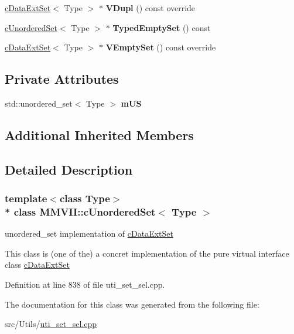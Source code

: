 \begin{DoxyCompactItemize}
\item 
\hyperlink{classMMVII_1_1cDataExtSet}{c\+Data\+Ext\+Set}$<$ Type $>$ $\ast$ {\bfseries V\+Dupl} () const override\hypertarget{classMMVII_1_1cUnorderedSet_af3d195fd0b2a911eee0072f65abbe82b}{}\label{classMMVII_1_1cUnorderedSet_af3d195fd0b2a911eee0072f65abbe82b}

\item 
\hyperlink{classMMVII_1_1cUnorderedSet}{c\+Unordered\+Set}$<$ Type $>$ $\ast$ {\bfseries Typed\+Empty\+Set} () const \hypertarget{classMMVII_1_1cUnorderedSet_aba542f65f1ab34612d477596a91e637b}{}\label{classMMVII_1_1cUnorderedSet_aba542f65f1ab34612d477596a91e637b}

\item 
\hyperlink{classMMVII_1_1cDataExtSet}{c\+Data\+Ext\+Set}$<$ Type $>$ $\ast$ {\bfseries V\+Empty\+Set} () const override\hypertarget{classMMVII_1_1cUnorderedSet_acc61ff15f305427632bd4e7a24b78baa}{}\label{classMMVII_1_1cUnorderedSet_acc61ff15f305427632bd4e7a24b78baa}

\end{DoxyCompactItemize}
\subsection*{Private Attributes}
\begin{DoxyCompactItemize}
\item 
std\+::unordered\+\_\+set$<$ Type $>$ {\bfseries m\+US}\hypertarget{classMMVII_1_1cUnorderedSet_acfb879540993e1777a9453fbca1e7734}{}\label{classMMVII_1_1cUnorderedSet_acfb879540993e1777a9453fbca1e7734}

\end{DoxyCompactItemize}
\subsection*{Additional Inherited Members}


\subsection{Detailed Description}
\subsubsection*{template$<$class Type$>$\\*
class M\+M\+V\+I\+I\+::c\+Unordered\+Set$<$ Type $>$}

unordered\+\_\+set implementation of \hyperlink{classMMVII_1_1cDataExtSet}{c\+Data\+Ext\+Set} 

This class is (one of the) a concret implementation of the pure virtual interface class \hyperlink{classMMVII_1_1cDataExtSet}{c\+Data\+Ext\+Set} 

Definition at line 838 of file uti\+\_\+set\+\_\+sel.\+cpp.



The documentation for this class was generated from the following file\+:\begin{DoxyCompactItemize}
\item 
src/\+Utils/\hyperlink{uti__set__sel_8cpp}{uti\+\_\+set\+\_\+sel.\+cpp}\end{DoxyCompactItemize}
